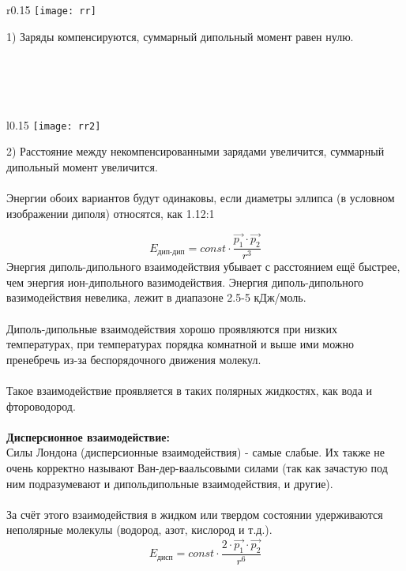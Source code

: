 \begin{wrapfigure}{r}{0.15\textwidth}
	\texttt{[image: rr]}
\end{wrapfigure}
1) Заряды компенсируются, суммарный дипольный момент равен нулю. 
\\\\\\\\\ \\

\begin{wrapfigure}{l}{0.15\textwidth}
	\texttt{[image: rr2]}
\end{wrapfigure}
2) Расстояние между некомпенсированными зарядами увеличится, суммарный дипольный момент увеличится. \\ \\ 
Энергии обоих вариантов будут одинаковы, если диаметры эллипса
(в условном изображении диполя) относятся, как 1.12:1
\begin{figure} [H]
	\centering {\texttt{[image: rr3]}}
\end{figure}
	\[
	E_{\text{дип-дип}} = const \cdot \dfrac{\vec{p_1}	 \cdot \vec{p_2} }{r^3}
	\]
	Энергия диполь-дипольного взаимодействия убывает с
	расстоянием ещё быстрее, чем энергия ион-дипольного
	вазимодействия. Энергия диполь-дипольного вазимодействия
	невелика, лежит в диапазоне 2.5-5 кДж/моль. \\ \\
	Диполь-дипольные взаимодействия хорошо проявляются при
	низких температурах, при температурах порядка комнатной и выше
	ими можно пренебречь из-за беспорядочного движения молекул. \\ \\ 
	Такое взаимодействие проявляется в таких полярных жидкостях,
	как вода и фтороводород. \\ \\ 
\textbf{Дисперсионное взаимодействие:} \\
Силы Лондона (дисперсионные взаимодействия) - самые слабые.
Их также не очень корректно называют Ван-дер-ваальсовыми
силами (так как зачастую под ним подразумевают и дипольдипольные взаимодействия, и другие). \\ \\
За счёт этого взаимодействия в жидком или твердом состоянии
удерживаются неполярные молекулы (водород, азот, кислород и
т.д.). 
	\[
	E_{\text{дисп}} = const \cdot \dfrac{2 \cdot \vec{p_1}	 \cdot \vec{p_2} }{r^6}
	\]	
\begin{figure} [H]
	\centering {\texttt{[image: rr4]}}
\end{figure}
